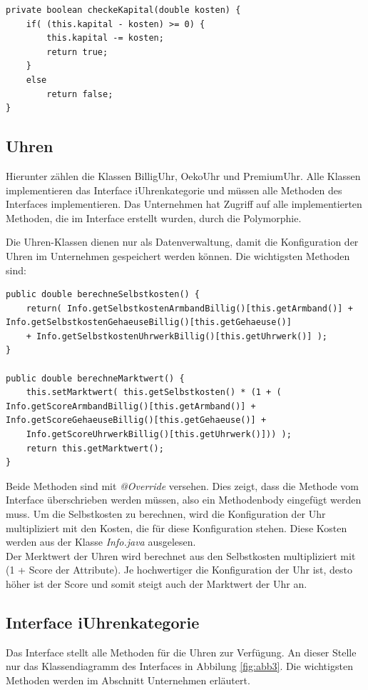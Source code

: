 \lstset{language=Java}
\begin{lstlisting}
private boolean checkeKapital(double kosten) {
	if( (this.kapital - kosten) >= 0) {
		this.kapital -= kosten;
		return true;
	}
	else
		return false;
}
\end{lstlisting}

\subsection{Uhren}
Hierunter zählen die Klassen BilligUhr, OekoUhr und PremiumUhr. Alle Klassen implementieren das Interface iUhrenkategorie und müssen alle Methoden des Interfaces implementieren. Das Unternehmen hat Zugriff auf alle implementierten Methoden, die im Interface erstellt wurden, durch die Polymorphie. 

Die Uhren-Klassen dienen nur als Datenverwaltung, damit die Konfiguration der Uhren im Unternehmen gespeichert werden können. Die wichtigsten Methoden sind: 

\lstset{language=Java}
\begin{lstlisting}
public double berechneSelbstkosten() {
	return( Info.getSelbstkostenArmbandBillig()[this.getArmband()] + Info.getSelbstkostenGehaeuseBillig()[this.getGehaeuse()] 
	+ Info.getSelbstkostenUhrwerkBillig()[this.getUhrwerk()] );
}

public double berechneMarktwert() {
	this.setMarktwert( this.getSelbstkosten() * (1 + ( Info.getScoreArmbandBillig()[this.getArmband()] + Info.getScoreGehaeuseBillig()[this.getGehaeuse()] + 
	Info.getScoreUhrwerkBillig()[this.getUhrwerk()])) ); 
	return this.getMarktwert();
}
\end{lstlisting}

Beide Methoden sind mit \textit{@Override} versehen. Dies zeigt, dass die Methode vom Interface überschrieben werden müssen, also ein Methodenbody eingefügt werden muss. Um die Selbstkosten zu berechnen, wird die Konfiguration der Uhr multipliziert mit den Kosten, die für diese Konfiguration stehen. Diese Kosten werden aus der Klasse \textit{Info.java} ausgelesen.\\

Der Merktwert der Uhren wird berechnet aus den Selbstkosten multipliziert mit (1 + Score der Attribute). Je hochwertiger die Konfiguration der Uhr ist, desto höher ist der Score und somit steigt auch der Marktwert der Uhr an.

\subsection{Interface iUhrenkategorie}
Das Interface stellt alle Methoden für die Uhren zur Verfügung. An dieser Stelle nur das Klassendiagramm des Interfaces in Abbilung \ref{fig:abb3}. Die wichtigsten Methoden werden im Abschnitt Unternehmen erläutert.

